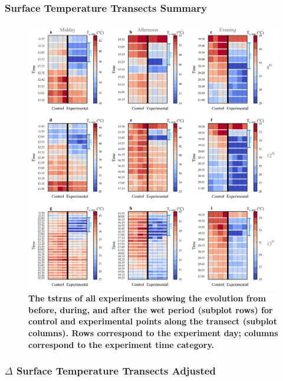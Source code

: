 \documentclass[final,3p,times,authoryear]{elsarticle}
\begin{document}
{\subsubsection{Surface Temperature Transects Summary}\label{sec:appendix7.5.8}

\begin{figure}
\centering
\includegraphics[trim={0 0 0 0},clip,scale=1.0]{pict044.png}
\caption{\bf The \gls{tstrns} of all experiments showing the evolution from before, during, and after the wet
period (subplot rows) for control and experimental points along the transect (subplot columns). Rows
correspond to the experiment day; columns correspond to the experiment time category.}
 \label{fig:7.15}
\end{figure}


\subsubsection{$\Delta$ Surface Temperature Transects Adjusted}\label{sec:appendix7.5.9}

}
\end{document}
